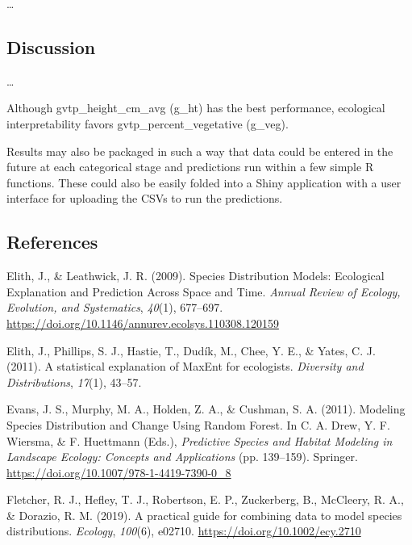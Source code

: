 \documentclass[
]{article}
\begin{document}
\ldots{}

\hypertarget{discussion}{%
\subsection{Discussion}\label{discussion}}

\ldots{}

Although gvtp\_height\_cm\_avg (g\_ht) has the best performance, ecological interpretability favors gvtp\_percent\_vegetative (g\_veg).

Results may also be packaged in such a way that data could be entered in the future at each categorical stage and predictions run within a few simple R functions. These could also be easily folded into a Shiny application with a user interface for uploading the CSVs to run the predictions.

\hypertarget{references}{%
\subsection*{References}\label{references}}

\hypertarget{refs}{}
\leavevmode\hypertarget{ref-elithSpeciesDistributionModels2009}{}%
Elith, J., \& Leathwick, J. R. (2009). Species Distribution Models: Ecological Explanation and Prediction Across Space and Time. \emph{Annual Review of Ecology, Evolution, and Systematics}, \emph{40}(1), 677--697. \url{https://doi.org/10.1146/annurev.ecolsys.110308.120159}

\leavevmode\hypertarget{ref-elithStatisticalExplanationMaxEnt2011}{}%
Elith, J., Phillips, S. J., Hastie, T., Dudík, M., Chee, Y. E., \& Yates, C. J. (2011). A statistical explanation of MaxEnt for ecologists. \emph{Diversity and Distributions}, \emph{17}(1), 43--57.

\leavevmode\hypertarget{ref-evansModelingSpeciesDistribution2011}{}%
Evans, J. S., Murphy, M. A., Holden, Z. A., \& Cushman, S. A. (2011). Modeling Species Distribution and Change Using Random Forest. In C. A. Drew, Y. F. Wiersma, \& F. Huettmann (Eds.), \emph{Predictive Species and Habitat Modeling in Landscape Ecology: Concepts and Applications} (pp. 139--159). Springer. \url{https://doi.org/10.1007/978-1-4419-7390-0_8}

\leavevmode\hypertarget{ref-fletcherPracticalGuideCombining2019}{}%
Fletcher, R. J., Hefley, T. J., Robertson, E. P., Zuckerberg, B., McCleery, R. A., \& Dorazio, R. M. (2019). A practical guide for combining data to model species distributions. \emph{Ecology}, \emph{100}(6), e02710. \url{https://doi.org/10.1002/ecy.2710}
\end{document}
